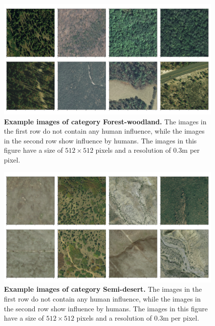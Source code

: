 \begin{figure}%
	\centering
	\captionsetup{width=1\linewidth}
	\includegraphics[width=1\textwidth]{Figures/forest-woodland_sample.pdf}
	\caption{\textbf{Example images of category Forest-woodland.} The images in the first row do not contain any human influence, while the images in the second row show influence by humans. The images in this figure have a size of $512\times512$ pixels and a resolution of $0.3$m per pixel.}
	\label{fig:forest-sample}
\end{figure}

\begin{figure}%
	\centering
	\captionsetup{width=1\linewidth}
	\includegraphics[width=1\textwidth]{Figures/semi-desert_sample.pdf}
	\caption{\textbf{Example images of category Semi-desert.} The images in the first row do not contain any human influence, while the images in the second row show influence by humans. The images in this figure have a size of $512\times512$ pixels and a resolution of $0.3$m per pixel.}
	\label{fig:desert-sample}
\end{figure}

